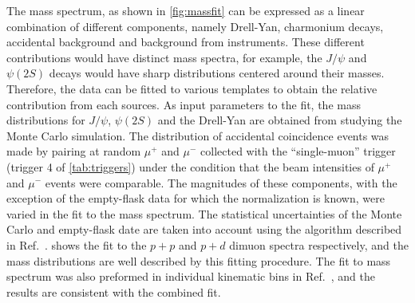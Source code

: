 \documentclass[reprint,aps,unsortedaddress,superscriptaddress,prl,floatfix,showpacs,linenumbers,final]{revtex4-2}
\begin{document}
The mass spectrum, as shown in \cref{fig:massfit} can be expressed as a linear combination of different components,
namely Drell-Yan, charmonium decays, accidental background and background from instruments.
These different contributions would have distinct mass spectra, for example, the $J/\psi$
and $\psi\left(2S\right)$ decays would have sharp distributions centered around their masses.
Therefore, the data can be fitted to various templates to obtain
the relative contribution from each sources. 
As input parameters to the fit, the mass distributions for $J/\psi$, $\psi\left(2S\right)$ 
and the Drell-Yan are obtained from studying the Monte Carlo simulation. %
The distribution of accidental coincidence events was made by pairing at random $\mu^+$ and $\mu^-$ collected with the ``single-muon'' trigger (trigger 4 of \cref{tab:triggers})
under the condition that the beam intensities of $\mu^+$ and $\mu^-$ events were comparable.
The magnitudes of these components,
with the exception of the empty-flask data for which the normalization is known,
were varied in the fit to the mass spectrum.
The statistical uncertainties of the Monte Carlo and empty-flask date are taken into account using the algorithm described in Ref.~\cite{barlow1993}.
 shows the fit to the $p+p$ and $p+d$ dimuon spectra respectively,
and the mass distributions are well described by this fitting procedure. 
The fit to mass spectrum was also preformed in individual kinematic bins in Ref.~\cite{leung2024a},
and the results are consistent with the combined fit.
\end{document}
